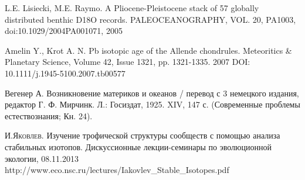 \documentclass[a5paper,openany]{book}
\begin{document}
\begin{thebibliography}{99}

L.E. Lisiecki, M.E. Raymo. A Pliocene-Pleistocene stack of 57 globally distributed benthic D18O records.
PALEOCEANOGRAPHY, VOL. 20, PA1003, doi:10.1029/2004PA001071, 2005
		

Amelin Y., Krot A. N. Pb isotopic age of the Allende chondrules.  Meteoritics \& Planetary Science, Volume 42, Issue 1321, pp. 1321-1335. 2007 DOI: 10.1111/j.1945-5100.2007.tb00577
		
Вегенер А. Возникновение материков и океанов / перевод с 3 немецкого издания, редактор Г. Ф. Мирчинк. Л.: Госиздат, 1925. XIV, 147 с. (Современные проблемы естествознания; Кн. 24).		
		
		
		
		
		
		
	  \textsc{И.Яковлев.} Изучение трофической структуры сообществ с помощью анализа стабильных изотопов. Дискуссионные лекции-семинары по эволюционной экологии, 08.11.2013 \\		http://www.eco.nsc.ru/lectures/Iakovlev\_Stable\_Isotopes.pdf
	

\end{thebibliography}
\end{document}
